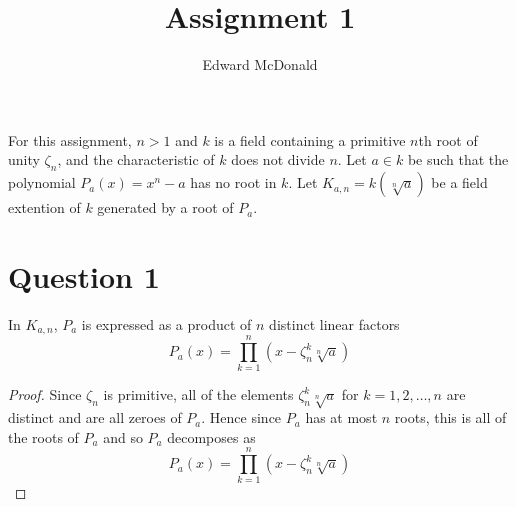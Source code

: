 \documentclass{unswmaths}
\begin{document}
\subject{Galois Theory}
\author{Edward McDonald}
\title{Assignment 1}
\setlength\parindent{0pt}
\newcommand{\Intgr}{\mathbb{Z}}
\newcommand{\Aut}{\operatorname{Aut}}

\unswtitle{}
For this assignment, $n > 1$ and $k$ is a field
containing a primitive $n$th root of unity $\zeta_n$,
and the characteristic of $k$ does not divide $n$.
Let $a \in k$ be such that the polynomial
$P_a(x) = x^n-a$ has no root in $k$.
Let $K_{a,n} = k(\!\sqrt[n]{a})$ be a field extention
of $k$ generated by a root of $P_a$.
\section*{Question 1}
\begin{lemma}
In $K_{a,n}$, $P_a$ is expressed as a product of $n$ distinct linear
factors
\begin{equation*}
P_a(x) = \prod_{k=1}^n (x-\zeta_n^k\sqrt[n]{a})
\end{equation*}
\end{lemma}
\begin{proof}
Since $\zeta_n$ is primitive, all
of the elements $\zeta_n^k\sqrt[n]{a}$ for $k = 1,2,\ldots,n$
are distinct and are all zeroes of $P_a$.
Hence since $P_a$ has at most $n$ roots, this is all of the roots
of $P_a$ and so $P_a$ decomposes as
\begin{equation*}
P_a(x) = \prod_{k=1}^n (x-\zeta_n^k\sqrt[n]{a})
\end{equation*}
\end{proof}
\end{document}
